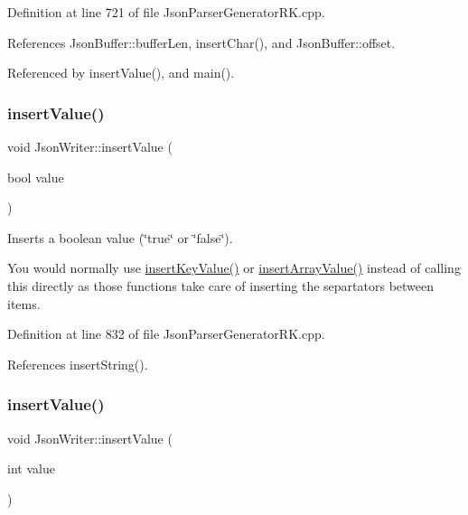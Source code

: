 Definition at line 721 of file Json\+Parser\+Generator\+R\+K.\+cpp.



References Json\+Buffer\+::buffer\+Len, insert\+Char(), and Json\+Buffer\+::offset.



Referenced by insert\+Value(), and main().

\mbox{\label{class_json_writer_ac58734c238ba7be066838591b0cc7743}} 
\subsubsection{\texorpdfstring{insert\+Value()}{insertValue()}\hspace{0.1cm}{\footnotesize\ttfamily [1/9]}}
{\footnotesize\ttfamily void Json\+Writer\+::insert\+Value (\begin{DoxyParamCaption}\item[{bool}]{value }\end{DoxyParamCaption})}



Inserts a boolean value (\char`\"{}true\char`\"{} or \char`\"{}false\char`\"{}). 

You would normally use \hyperlink{class_json_writer_ac2de627389b59ce2c8ed95e10ea213bf}{insert\+Key\+Value()} or \hyperlink{class_json_writer_a8b4dc6726b66b4f277c7674e60c8a057}{insert\+Array\+Value()} instead of calling this directly as those functions take care of inserting the separtators between items. 

Definition at line 832 of file Json\+Parser\+Generator\+R\+K.\+cpp.



References insert\+String().

\mbox{\label{class_json_writer_a69da120fb595f2820dd73f0c9339e093}} 
\subsubsection{\texorpdfstring{insert\+Value()}{insertValue()}\hspace{0.1cm}{\footnotesize\ttfamily [2/9]}}
{\footnotesize\ttfamily void Json\+Writer\+::insert\+Value (\begin{DoxyParamCaption}\item[{int}]{value }\end{DoxyParamCaption})\hspace{0.3cm}{\ttfamily [inline]}}



